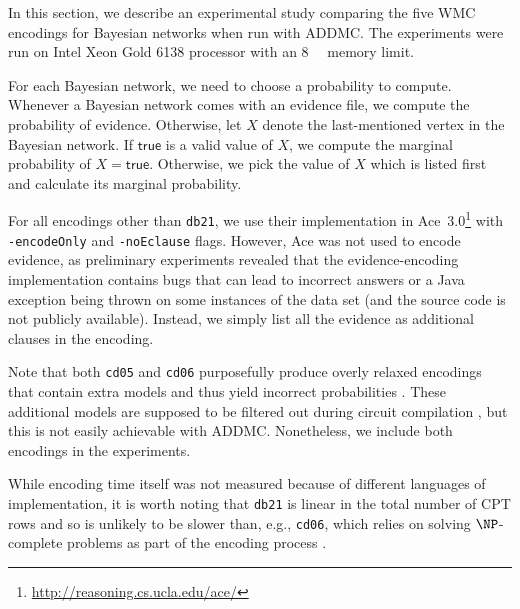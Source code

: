 \documentclass[letterpaper]{article} %
\theoremstyle{definition}
\theoremstyle{remark}
\begin{document}
{In this section, we describe an experimental study comparing the five WMC
encodings for Bayesian networks when run with ADDMC. The experiments were run on
Intel Xeon Gold 6138 processor with an \SI{8}{\giga\byte} memory limit.

For each Bayesian network, we need to choose a probability to compute. Whenever
a Bayesian network comes with an evidence file, we compute the probability of
evidence. Otherwise, let $X$ denote the last-mentioned vertex in the Bayesian
network. If $\mathsf{true}$ is a valid value of $X$, we compute the marginal
probability of $X = \mathsf{true}$. Otherwise, we pick the value of $X$ which is
listed first and calculate its marginal probability.

For all encodings other than \texttt{db21}, we use their implementation in
Ace~3.0\footnote{\url{http://reasoning.cs.ucla.edu/ace/}} with
\texttt{-encodeOnly} and \texttt{-noEclause} flags. However, Ace was not used to
encode evidence, as preliminary experiments revealed that the evidence-encoding
implementation contains bugs that can lead to incorrect answers or a Java
exception being thrown on some instances of the data set (and the source code is
not publicly available). Instead, we simply list all the evidence as additional
clauses in the encoding.

Note that both \texttt{cd05} and \texttt{cd06} purposefully produce overly
relaxed encodings that contain extra models and thus yield incorrect
probabilities \cite{DBLP:conf/ijcai/ChaviraD05,DBLP:conf/sat/ChaviraD06}. These
additional models are supposed to be filtered out during circuit compilation
\cite{DBLP:conf/ijcai/ChaviraD05}, but this is not easily achievable with ADDMC.
Nonetheless, we include both encodings in the experiments.

While encoding time itself was not measured because of different languages of
implementation, it is worth noting that \texttt{db21} is linear in the total
number of CPT rows and so is unlikely to be slower than, e.g., \texttt{cd06},
which relies on solving $\NP$-complete problems as part of the encoding process
\cite{DBLP:conf/sat/ChaviraD06}.

}
\end{document}
